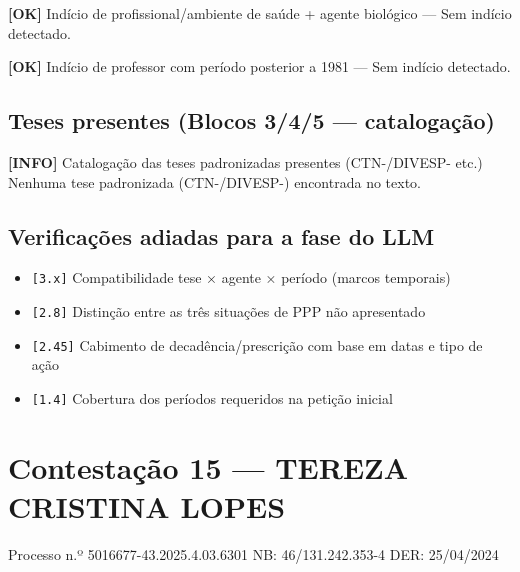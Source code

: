 \documentclass[12pt,a4paper]{article}
\newcommand{\statusOK}[1]{\textcolor{corOK}{\textbf{[OK]}} #1}
\newcommand{\statusINFO}[1]{\textcolor{corINFO}{\textbf{[INFO]}} #1}
\begin{document}
\medskip
\statusOK{Indício de profissional/ambiente de saúde + agente biológico} --- Sem indício detectado.

\medskip
\statusOK{Indício de professor com período posterior a 1981} --- Sem indício detectado.

\subsection{Teses presentes (Blocos 3/4/5 --- catalogação)}

\statusINFO{Catalogação das teses padronizadas presentes (CTN-/DIVESP- etc.)}\\
Nenhuma tese padronizada (CTN-/DIVESP-) encontrada no texto.

\subsection{Verificações adiadas para a fase do LLM}

\begin{itemize}
  \item \texttt{[3.x]} Compatibilidade tese × agente × período (marcos temporais)
  \item \texttt{[2.8]} Distinção entre as três situações de PPP não apresentado
  \item \texttt{[2.45]} Cabimento de decadência/prescrição com base em datas e tipo de ação
  \item \texttt{[1.4]} Cobertura dos períodos requeridos na petição inicial
\end{itemize}



\clearpage
{}
\section{Contestação 15 --- TEREZA CRISTINA LOPES}
\begin{center}
  {\small Processo n.º 5016677-43.2025.4.03.6301 \quad NB: 46/131.242.353-4 \quad DER: 25/04/2024}
\end{center}
\end{document}

